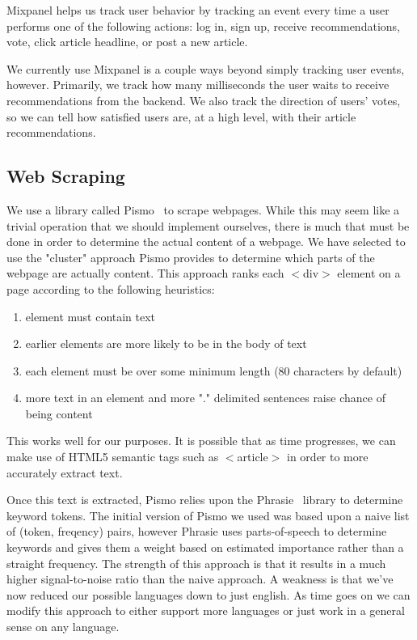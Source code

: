 \documentclass[11pt,letterpaper,titlepage]{article}
\begin{document}
Mixpanel helps us track user behavior by tracking an event every time a user performs one of the following actions: log in, sign up, receive recommendations, vote, click article headline, or post a new article.

We currently use Mixpanel is a couple ways beyond simply tracking user events, however. Primarily, we track how many milliseconds the user waits to receive recommendations from the backend.
We also track the direction of users' votes, so we can tell how satisfied users are, at a high level, with their article recommendations.

\subsection{Web Scraping}
\label{sec:scraping}
We use a library called Pismo~\cite{pismo} to scrape
webpages.  While this may seem like a trivial operation that we should implement
ourselves, there is much that must be done in order to determine the actual
content of a webpage.  We have selected to use the "cluster" approach Pismo
provides to determine which parts of the webpage are actually content.  This
approach ranks each $<$div$>$ element on a page according to the following
heuristics:

\begin{enumerate}
 \item element must contain text
 \item earlier elements are more likely to be in the body of text
 \item each element must be over some minimum length (80 characters by default)
 \item more text in an element and more "." delimited sentences raise chance of
being content
\end{enumerate}

This works well for our purposes.  It is possible that as time progresses, we
can make use of HTML5 semantic tags such as $<$article$>$ in order to more
accurately extract text.

Once this text is extracted, Pismo relies upon the
Phrasie~\cite{phrasie} library to determine keyword tokens.
The initial version of Pismo we used was based upon a naive list of (token,
freqency) pairs, however Phrasie uses parts-of-speech to determine keywords and
gives them a weight based on estimated importance rather than a straight frequency.  The strength of this
approach is that it results in a much higher signal-to-noise ratio than the
naive approach.  A weakness is that we've now reduced our possible languages
down to just english.  As time goes on we can modify this approach to either
support more languages or just work in a general sense on any language.
\end{document}
